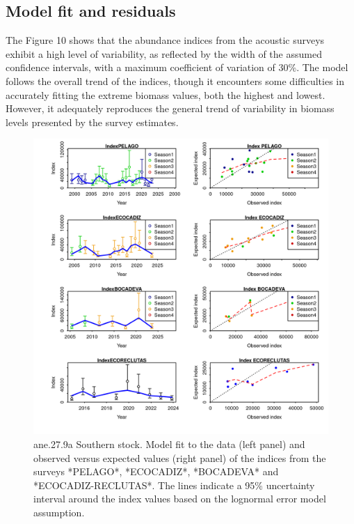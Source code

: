 \documentclass[
]{article}
\begin{document}
\hypertarget{model-fit-and-residuals}{%
\subsection{Model fit and residuals}\label{model-fit-and-residuals}}

The Figure 10 shows that the abundance indices from the acoustic surveys
exhibit a high level of variability, as reflected by the width of the
assumed confidence intervals, with a maximum coefficient of variation of
30\%. The model follows the overall trend of the indices, though it
encounters some difficulties in accurately fitting the extreme biomass
values, both the highest and lowest. However, it adequately reproduces
the general trend of variability in biomass levels presented by the
survey estimates.

\begin{figure}[H]

{\centering \includegraphics[width=0.95\linewidth]{report/run/S1.0_4FLEETS_SelECO_RecIndex_Mnewfix/fig_indices_fit} 

}

\caption{ane.27.9a Southern stock. Model fit to the data (left panel) and observed versus expected values (right panel) of the indices from the surveys *PELAGO*, *ECOCADIZ*, *BOCADEVA* and *ECOCADIZ-RECLUTAS*. The lines indicate a 95\% uncertainty interval around the index values based on the lognormal error model assumption. }\label{fig:unnamed-chunk-40}
\end{figure}
\end{document}
